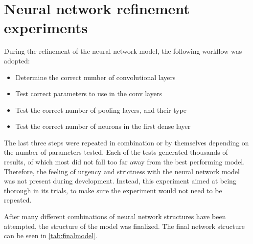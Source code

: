 
\section{Neural network refinement experiments}
\label{ex:networkref}

During the refinement of the neural network model, the following workflow was adopted:

\begin{itemize}
    \item Determine the correct number of convolutional layers
    \item Test correct parameters to use in the conv layers
    \item Test the correct number of pooling layers, and their type
    \item Test the correct number of neurons in the first dense layer
\end{itemize}

The last three steps were repeated in combination or by themselves depending on the number of parameters tested.
Each of the tests generated thousands of results, of which most did not fall too far away from the best performing model.
Therefore, the feeling of urgency and strictness with the neural network model was not present during development.
Instead, this experiment aimed at being thorough in its trials, to make sure the experiment would not need to be repeated.

After many different combinations of neural network structures have been attempted, the structure of the model was finalized.
The final network structure can be seen in \cref{tab:finalmodel}.

